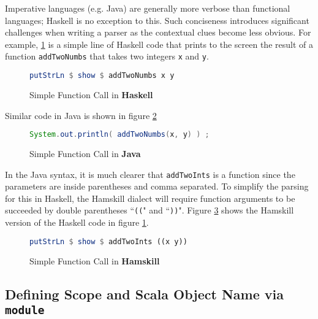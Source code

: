 \documentclass{report}
\begin{document}
Imperative languages (e.g. Java) are generally more verbose than functional languages; Haskell is no exception to this.  Such conciseness introduces significant challenges when writing a parser as the contextual clues become less obvious.  For example, \ref{fig:addTwoNumbersHaskell} is a simple line of Haskell code that prints to the screen the result of a function {\tt addTwoNumbs} that takes two integers {\tt x} and {\tt y}. 

\begin{figure}[H]\label{fig:addTwoNumbersHaskell}
\begin{mdframed}
\begin{lstlisting}[language=Haskell]
putStrLn $ show $ addTwoNumbs x y
\end{lstlisting}
\end{mdframed}
\caption{Simple Function Call in \bf{Haskell}}
\end{figure}

Similar code in Java is shown in figure \ref{fig:addTwoNumbersJava}

\begin{figure}[H]\label{fig:addTwoNumbersJava}
\begin{mdframed}
\begin{lstlisting}[language=Java]
System.out.println( addTwoNumbs(x, y) ) ;
\end{lstlisting}
\end{mdframed}
\caption{Simple Function Call in \bf{Java}}
\end{figure}

In the Java syntax, it is much clearer that {\tt addTwoInts} is a function since the parameters are inside parentheses and comma separated.  To simplify the parsing for this in Haskell, the Hamskill dialect will require function arguments to be succeeded by double parentheses ``{\tt ((}" and ``{\tt ))}".  Figure \ref{fig:addTwoNumbersHamskill} shows the Hamskill version of the Haskell code in figure \ref{fig:addTwoNumbersHaskell}.

\begin{figure}[H]\label{fig:addTwoNumbersHamskill}
\begin{mdframed}
\begin{lstlisting}[language=Haskell]
putStrLn $ show $ addTwoInts ((x y))
\end{lstlisting}
\end{mdframed}
\caption{Simple Function Call in \bf{Hamskill}}
\end{figure}

\subsection{Defining Scope and Scala Object Name via {\tt module}}
\end{document}
